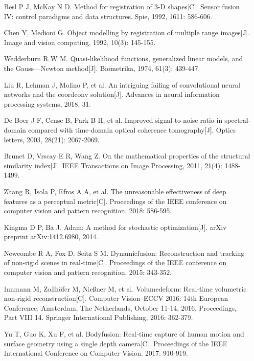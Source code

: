 Besl P J, McKay N D. Method for registration of 3-D shapes[C]. Sensor fusion IV: control paradigms and data structures. Spie, 1992, 1611: 586-606.


Chen Y, Medioni G. Object modelling by registration of multiple range images[J]. Image and vision computing, 1992, 10(3): 145-155.

Wedderburn R W M. Quasi-likelihood functions, generalized linear models, and the Gauss—Newton method[J]. Biometrika, 1974, 61(3): 439-447.


Liu R, Lehman J, Molino P, et al. An intriguing failing of convolutional neural networks and the coordconv solution[J]. Advances in neural information processing systems, 2018, 31.

De Boer J F, Cense B, Park B H, et al. Improved signal-to-noise ratio in spectral-domain compared with time-domain optical coherence tomography[J]. Optics letters, 2003, 28(21): 2067-2069.

Brunet D, Vrscay E R, Wang Z. On the mathematical properties of the structural similarity index[J]. IEEE Transactions on Image Processing, 2011, 21(4): 1488-1499.

Zhang R, Isola P, Efros A A, et al. The unreasonable effectiveness of deep features as a perceptual metric[C]. Proceedings of the IEEE conference on computer vision and pattern recognition. 2018: 586-595.

Kingma D P, Ba J. Adam: A method for stochastic optimization[J]. arXiv preprint arXiv:1412.6980, 2014.

 Newcombe R A, Fox D, Seitz S M. Dynamicfusion: Reconstruction and tracking of non-rigid scenes in real-time[C]. Proceedings of the IEEE conference on computer vision and pattern recognition. 2015: 343-352.

 Innmann M, Zollhöfer M, Nießner M, et al. Volumedeform: Real-time volumetric non-rigid reconstruction[C]. Computer Vision–ECCV 2016: 14th European Conference, Amsterdam, The Netherlands, October 11-14, 2016, Proceedings, Part VIII 14. Springer International Publishing, 2016: 362-379.

Yu T, Guo K, Xu F, et al. Bodyfusion: Real-time capture of human motion and surface geometry using a single depth camera[C]. Proceedings of the IEEE International Conference on Computer Vision. 2017: 910-919.


